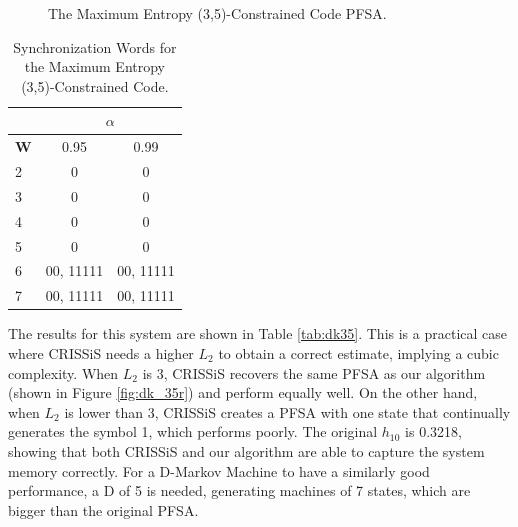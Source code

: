{\begin{figure}
\centering
{}
\caption{The Maximum Entropy (3,5)-Constrained Code PFSA.\label{fig:dk_35}}
\end{figure}

\begin{table}
\centering
\begin{tabular}{|l|c|c|}
\hline
 & \multicolumn{2}{c|}{\textbf{$\alpha$}}\\
 \hline
\textbf{W} & 0.95 & 0.99 \\
\hline
2 & 0 & 0 \\ 
3 & 0 & 0 \\ 
4 & 0 & 0 \\ 
5 & 0  & 0 \\
6 & 00, 11111  & 00, 11111 \\
7 & 00, 11111  & 00, 11111 \\
 \hline
\end{tabular}
\caption{Synchronization Words for the Maximum Entropy (3,5)-Constrained Code. \label{tab:dk35synch}}
\end{table}

The results for this system are shown in Table \ref{tab:dk35}. This is a practical case where CRISSiS needs a higher $L_2$ to obtain a correct estimate, implying a cubic complexity. When $L_2$ is 3, CRISSiS recovers the same PFSA as our algorithm (shown in Figure \ref{fig:dk_35r}) and perform equally well. On the other hand, when $L_2$ is lower than 3, CRISSiS creates a PFSA with one state that continually generates the symbol 1, which performs poorly. The original $h_{10}$ is 0.3218, showing that both CRISSiS and our algorithm are able to capture the system memory correctly. For a D-Markov Machine to have a similarly good performance, a D of 5 is needed, generating machines of 7 states, which are bigger than the original PFSA.

}

